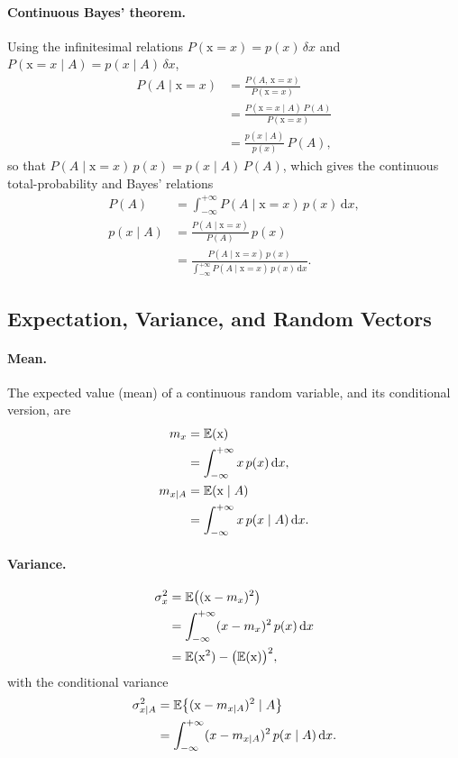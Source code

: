 \paragraph{Continuous Bayes' theorem.}
Using the infinitesimal relations $P(\mathrm{x}=x) = p(x)\,\delta x$ and $P(\mathrm{x}=x\mid A) = p(x\mid A)\,\delta x$,
\begin{align}
P(A\mid \mathrm{x}=x) &= \frac{P(A,\, \mathrm{x}=x)}{P(\mathrm{x}=x)} \\
&= \frac{P(\mathrm{x}=x\mid A)\,P(A)}{P(\mathrm{x}=x)} \\
&= \frac{p(x\mid A)}{p(x)}\,P(A),
\end{align}
so that $P(A\mid \mathrm{x}=x)\,p(x) = p(x\mid A)\,P(A)$, which gives the continuous total-probability and Bayes' relations
\begin{align}
P(A) &= \int_{-\infty}^{+\infty} P(A\mid \mathrm{x}=x)\,p(x)\,\mathrm{d}x, \\
p(x\mid A) &= \frac{P(A\mid \mathrm{x}=x)}{P(A)}\,p(x) \\
&= \frac{P(A\mid \mathrm{x}=x)\,p(x)}{\int_{-\infty}^{+\infty} P(A\mid \mathrm{x}=x)\,p(x)\,\mathrm{d}x}.
\end{align}

\subsection{Expectation, Variance, and Random Vectors}

\paragraph{Mean.}
The expected value (mean) of a continuous random variable, and its conditional version, are
\begin{align}
m_x &= \mathbb{E}(\mathrm{x}) \\
&= \int_{-\infty}^{+\infty} x\,p(x)\,\mathrm{d}x, \\
m_{x\mid A} &= \mathbb{E}(\mathrm{x}\mid A) \\
&= \int_{-\infty}^{+\infty} x\,p(x\mid A)\,\mathrm{d}x.
\end{align}

\paragraph{Variance.}
\begin{align}
\sigma_x^2 &= \mathbb{E}\big((\mathrm{x}-m_x)^2\big) \\
&= \int_{-\infty}^{+\infty}(x-m_x)^2\,p(x)\,\mathrm{d}x \\
&= \mathbb{E}(\mathrm{x}^2) - \big(\mathbb{E}(\mathrm{x})\big)^2,
\end{align}
with the conditional variance
\begin{align}
\sigma_{x\mid A}^2 &= \mathbb{E}\big\{(\mathrm{x}-m_{x\mid A})^2 \mid A\big\} \\
&= \int_{-\infty}^{+\infty}(x-m_{x\mid A})^2\,p(x\mid A)\,\mathrm{d}x.
\end{align}

